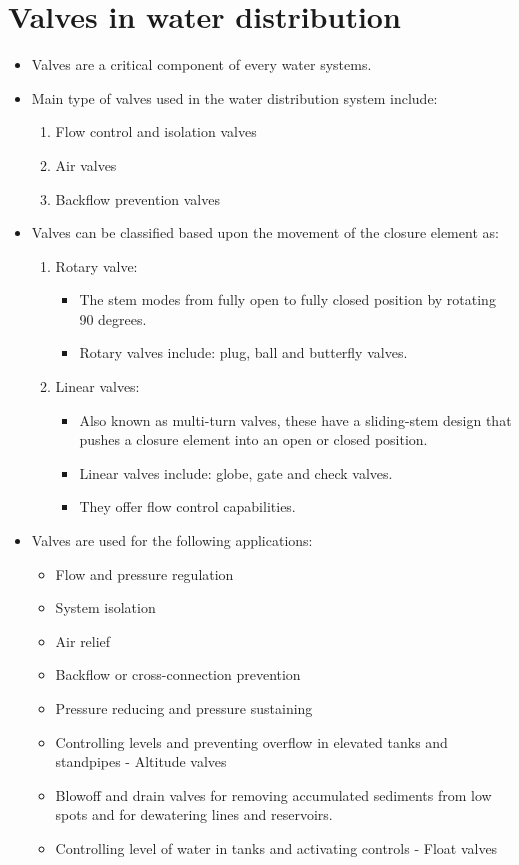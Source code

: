 \section{Valves in water distribution}
\begin{itemize}
\item  Valves are a critical component of every water systems.
\item Main type of valves used in the water distribution system include:
\begin{enumerate}
\item Flow control and isolation valves
\item Air valves
\item Backflow prevention valves
\end{enumerate}
\item Valves can be classified based upon the movement of the closure element as:
\begin{enumerate}
\item Rotary valve:
\begin{itemize}
\item The stem modes from fully open to fully closed position by rotating 90 degrees. 
\item Rotary valves include:  plug, ball and butterfly valves.
\end{itemize}
\item Linear valves:
\begin{itemize}
\item Also known as multi-turn valves, these have a sliding-stem design that pushes a closure element into an open or closed position.
\item Linear valves include:  globe, gate and check valves.
\item They offer flow control capabilities.
\end{itemize}
\end{enumerate}
\item Valves are used for the following applications:
\begin{itemize}
\item Flow and pressure regulation
\item System isolation
\item Air relief
\item Backflow or cross-connection prevention
\item Pressure reducing and pressure sustaining
\item Controlling levels and preventing overflow in elevated tanks and standpipes - Altitude valves
\item Blowoff and drain valves for removing accumulated sediments from low spots and for dewatering lines and reservoirs.
\item Controlling level of water in tanks and activating controls - Float valves
\end{itemize}
\end{itemize}
